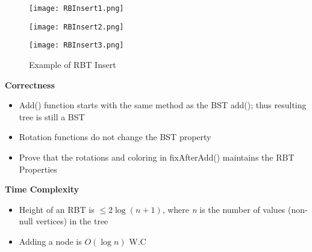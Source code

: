 \documentclass[10pt, 
a4paper, 
oneside, 
headinclude, footinclude, 
BCOR5mm]
{scrartcl}
\begin{document}
\begin{figure}[H]
    \begin{center}
        \texttt{[image: RBInsert1.png]}
    \end{center}
\end{figure}
\begin{figure}[H]
    \begin{center}
        \texttt{[image: RBInsert2.png]}
    \end{center}
\end{figure}
\begin{figure}[H]
    \begin{center}
        \texttt{[image: RBInsert3.png]}
        \caption{Example of RBT Insert}
    \end{center}
\end{figure}
\textbf{Correctness}
\begin{itemize}
    \item Add() function starts with the same method as the BST add(); thus resulting tree is still a BST
    \item Rotation functions do not change the BST property
    \item Prove that the rotations and coloring in fixAfterAdd() maintains the RBT Properties
\end{itemize}
\textbf{Time Complexity}
\begin{itemize}
    \item Height of an RBT is $\leq 2\log(n+1)$, where \textit{n} is the number of values (non-null vertices) in the tree
    \item Adding a node is $O(\log n)$ W.C
\end{itemize}
\end{document}
